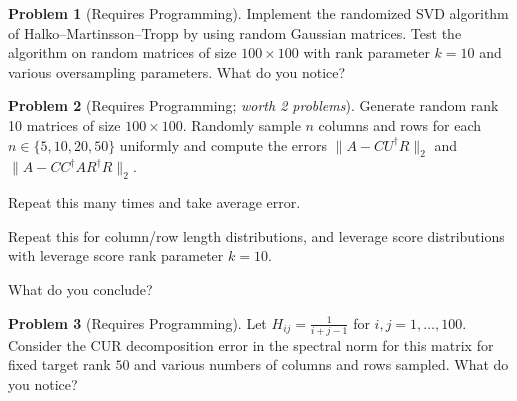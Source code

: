 \documentclass{amsart}[11pt]
\theoremstyle{definition}
\newtheorem{problem}{Problem}
\begin{document}
\begin{problem}[Requires Programming]
Implement the randomized SVD algorithm of Halko--Martinsson--Tropp by using random Gaussian matrices. Test the algorithm on random matrices of size $100\times 100$ with rank parameter $k=10$ and various oversampling parameters. What do you notice?
\end{problem}

\begin{problem}[Requires Programming; \textit{worth 2 problems}]
Generate random rank 10 matrices of size $100\times 100$. Randomly sample $n$ columns and rows for each $n\in\{5,10,20,50\}$ uniformly and compute the errors $\|A-CU^\dagger R\|_2$ and $\|A-CC^\dagger AR^\dagger R\|_2$.

Repeat this many times and take average error. 

Repeat this for column/row length distributions, and leverage score distributions with leverage score rank parameter $k=10$.

What do you conclude?
\end{problem}

\begin{problem}[Requires Programming]
Let $H_{ij} = \frac{1}{i+j-1}$ for $i,j=1,\dots,100$. Consider the CUR decomposition error in the spectral norm for this matrix for fixed target rank $50$ and various numbers of columns and rows sampled. What do you notice?
\end{problem}
\end{document}
